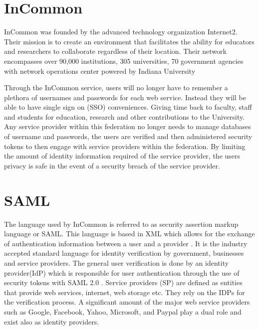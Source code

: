 \documentclass[9pt,twocolumn,twoside]{../../styles/osajnl}
\begin{document}
\section{InCommon}

InCommon was founded by the advanced technology organization
Internet2.  Their mission is to create an environment that facilitates
the ability for educators and researchers to collaborate regardless of
their location.  Their network encompasses over 90,000 institutions,
305 universities, 70 government agencies with network operations
center powered by Indiana University \cite{www-internet2}

Through the InCommon service, users will no longer have to   remember a plethora
of usernames and passwords for each web service.  Instead\TODO{,} they
will be able to have single sign on (SSO) conveniences.  Giving time
back to faculty, staff and students for education, research and other
contributions to the University.  Any service provider within this
federation no longer needs to manage databases of username and
passwords, the users are verified and then administered security
tokens to then engage with service providers within the federation.
By limiting the amount of identity information required of the service
provider, the users privacy is safe  in the
event of a security breach of the service provider.

\section{SAML}

The language used by InCommon is referred to as security assertion
markup language or SAML.  This language is based in XML which allows
for the exchange of authentication information between a user and a
provider \cite{www-wiki}.  It is the industry accepted standard
language for identity verification by government, businesses and
service providers.  The general user
verification is done by an identity provider(IdP) which is responsible
for user authentication through the use of security tokens with SAML
2.0 \cite{www-empower}. Service providers (SP) are defined as entities
that provide web services, internet, web storage etc.  They rely on
the IDPs for the verification process.  A significant amount of the
major web service providers such as Google, Facebook, Yahoo,
Microsoft, and Paypal play a dual role and exist also as identity
providers.
\end{document}

